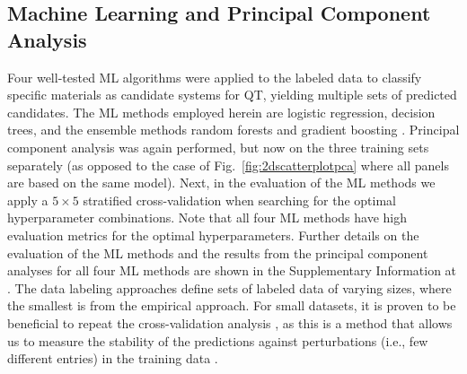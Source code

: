 \documentclass[superscriptaddress,
preprint,
 amsmath,amssymb,
 aps,
]{revtex4-2}
\newcommand{\mrk}[1]{\textcolor{red}{#1}}
\begin{document}

\subsection*{Machine Learning and Principal Component Analysis}
Four well-tested ML algorithms were applied to the labeled data to classify specific materials as candidate systems for QT, yielding multiple sets of predicted candidates. The ML methods employed herein are logistic regression, decision trees, and the ensemble methods random forests and gradient boosting \cite{Mehta2019,Hastie2009,Murphy2012}. 
Principal component analysis was again performed, but now on the three training sets separately
(as opposed to the case of Fig.~\ref{fig:2dscatterplotpca} where all panels are based on the same model). 
Next, in the evaluation of the ML methods we  
apply a $5\times 5$ stratified cross-validation \cite{Hastie2009} when searching for the optimal hyperparameter combinations. Note that all four ML methods have high evaluation metrics for the optimal hyperparameters. Further details on the evaluation of the ML methods and the results from the principal component analyses for all four ML methods are shown in the Supplementary Information at \cite{supplementary}.  
The data labeling approaches define sets of labeled data of varying sizes, where the smallest is from the empirical approach. For small datasets, it is proven to be beneficial to repeat the cross-validation analysis \cite{Hastie2009}, as this is a method that allows us to measure the stability of the predictions against perturbations (i.e., few different entries) in the training data \cite{Beleites2008}.
\end{document}

